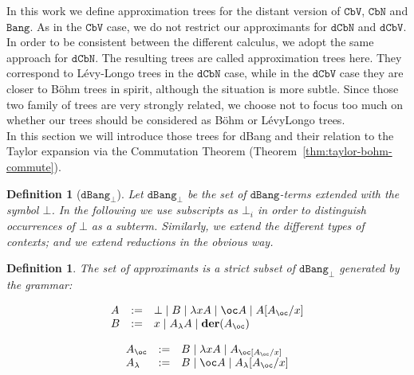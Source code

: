 \documentclass[10pt,a4paper]{article}
\newtheorem{definition}[theorem]{Definition}
\newcommand{\<}{\langle}
\renewcommand{\>}{\rangle}
\newcommand{\der}[1]{\ensuremath{\mathbf{der}(#1)}}
\newcommand{\dcbn}{\ensuremath{\mathtt{dCbN}}}
\newcommand{\cbn}{\ensuremath{\mathtt{CbN}}}
\newcommand{\dcbv}{\ensuremath{\mathtt{dCbV}}}
\newcommand{\cbv}{\ensuremath{\mathtt{CbV}}}
\newcommand{\bang}{\ensuremath{\mathtt{Bang}}}
\newcommand{\dbang}{\ensuremath{\mathtt{dBang}}}
\newcommand{\dbangb}{\ensuremath{\dbang_\bot}}
\newcommand{\es}[2]{[#1/#2]}
\newcommand{\nativeendash}{\ifmmode\text{\textendash}\else\textendash\fi}
\begin{document}
In this work we define approximation trees for the distant version of \cbv{}, \cbn{} and \bang. As in the \cbv{} case, we do not restrict our approximants for \dcbn{} and \dcbv{}. In order to be consistent between the different calculus, we adopt the same approach for \dcbn{}. The resulting trees are called approximation trees here. They correspond to Lévy-Longo trees in the \dcbn{} case, while in the \dcbv{} case they are closer to Böhm trees in spirit, although the situation is more subtle. Since those two family of trees are very strongly related, we choose not to focus too much on whether our trees should be considered as Böhm or Lévy\nativeendash{}Longo trees.\\


In this section we will introduce those trees for dBang and their relation to the Taylor expansion via the Commutation Theorem (Theorem~\ref{thm:taylor-bohm-commute}). 



\begin{definition}[$\dbangb$]
	Let $\dbangb$ be the set of $\dbang$-terms extended with the symbol $\bot$.
	In the following we use subscripts as $\bot_i$ in order to distinguish
	occurrences of $\bot$ as a subterm.
	Similarly, we extend the different types of contexts; and
	we extend reductions in the obvious way.
\end{definition}
\begin{definition}\label{def:bohm_approx}
	The set of approximants is a strict subset of $\dbangb$  generated by the grammar:
\begin{minipage}{0.49\textwidth}
	$$\begin{array}{lll}
	A&:= & \bot\mid B\mid \lambda xA\mid \oc A\mid A\es{A_\oc }x\\
	B&:=& x\mid A_\lambda A\mid \der{A_\oc}\\
	\end{array}$$
\end{minipage}
%
\begin{minipage}{0.49\textwidth}
	$$\begin{array}{lll}
	A_\oc &:= & B \mid \lambda x A \mid A_\oc \es{A_\oc}x\\
	A_\lambda &:= &B \mid \oc A\mid A_\lambda \es{A_\oc}x\\
	\end{array}$$
\end{minipage}
\end{definition}
\end{document}
